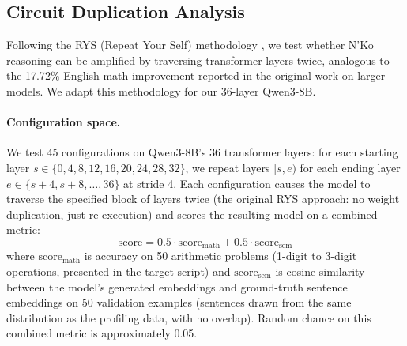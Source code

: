 \documentclass[11pt]{article}
\begin{document}
\subsection{Circuit Duplication Analysis}
\label{sec:circuit-dup}

Following the RYS (Repeat Your Self) methodology \cite{ng2024rys}, we test whether N'Ko reasoning can be amplified by traversing transformer layers twice, analogous to the 17.72\% English math improvement reported in the original work on larger models. We adapt this methodology for our 36-layer Qwen3-8B.

\paragraph{Configuration space.}
We test 45 configurations on Qwen3-8B's 36 transformer layers: for each starting layer $s \in \{0, 4, 8, 12, 16, 20, 24, 28, 32\}$, we repeat layers $[s, e)$ for each ending layer $e \in \{s{+}4, s{+}8, \ldots, 36\}$ at stride 4.
Each configuration causes the model to traverse the specified block of layers twice (the original RYS approach: no weight duplication, just re-execution) and scores the resulting model on a combined metric:
\begin{equation}
\text{score} = 0.5 \cdot \text{score}_\text{math} + 0.5 \cdot \text{score}_\text{sem}
\end{equation}
where $\text{score}_\text{math}$ is accuracy on 50 arithmetic problems (1-digit to 3-digit operations, presented in the target script) and $\text{score}_\text{sem}$ is cosine similarity between the model's generated embeddings and ground-truth sentence embeddings on 50 validation examples (sentences drawn from the same distribution as the profiling data, with no overlap).
Random chance on this combined metric is approximately 0.05.
\end{document}
